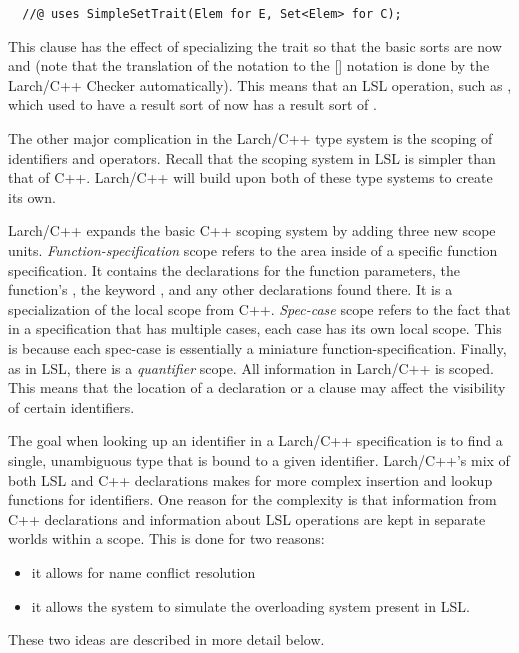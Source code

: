 \begin{verbatim}
  //@ uses SimpleSetTrait(Elem for E, Set<Elem> for C);
\end{verbatim}

\noindent This  clause has the effect of specializing the trait
so that the basic sorts are now  and
 (note that the translation of the \reserved{<>}
notation to the [] notation is done by the Larch/C++ Checker
automatically). This means that an LSL operation, such as
, which used to have a result sort of  now
has a result sort of .

The other major complication in the Larch/C++ type system is the
scoping of identifiers and operators. Recall that the scoping system
in LSL is simpler than that of C++. Larch/C++ will build upon both of
these type systems to create its own. 

Larch/C++ expands the basic C++ scoping system by adding three new
scope units. \emph{Function-specification} scope refers to the area
inside of a specific function specification. It contains the
declarations for the function parameters, the function's
, the keyword , and any other
declarations found there. It is a specialization of the local scope from
C++. \emph{Spec-case} scope refers to the fact that in a specification
that has multiple cases, each case has its own local scope. This is
because each spec-case is essentially a miniature
function-specification. Finally, as in LSL, there is a
\emph{quantifier} scope. All information in Larch/C++ is scoped. This
means that the location of a declaration or a
 clause may affect the visibility of certain identifiers.

The goal when looking up an identifier in a Larch/C++ specification is
to find a single, unambiguous type that is bound to a given identifier.
Larch/C++'s mix of both LSL and C++ declarations makes
for more complex insertion and lookup functions for identifiers. One
reason for the complexity is that information from C++ declarations
and information about LSL operations are kept in separate worlds
within a scope. This is done for two reasons:
\begin{itemize} 
\item it allows for name conflict resolution
\item it allows the system to simulate the overloading system present in LSL.
\end{itemize}
\noindent These two ideas are described in more detail below.

